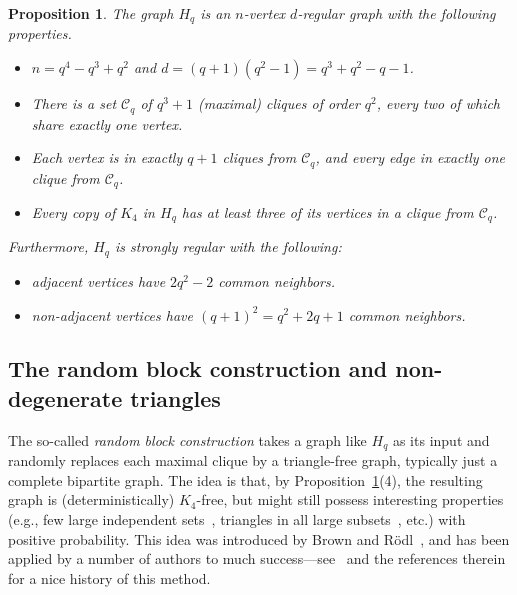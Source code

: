 \documentclass[A4paper,reqno,oneside,12pt]{amsart}
\theoremstyle{plain}
\newtheorem{proposition}[theorem]{Proposition}
\theoremstyle{definition}
\newcommand{\scC}{\mathscr{C}}
\begin{document}
\begin{proposition}
\label{prp: Hq}
    The graph $H_q$ is an $n$-vertex $d$-regular graph with the following properties.
    \begin{itemize}
        \item[1.] $n = q^4-q^3+q^2$ and $d = (q+1)(q^2-1) = q^3 + q^2 - q -1$.
        \item[2.] There is a set $\scC_q$ of $q^3+1$ (maximal) cliques of order $q^2$, every two of which share exactly one vertex.
        \item[3.] Each vertex is in exactly $q+1$ cliques from $\scC_q$, and every edge in exactly one clique from $\scC_q$.
        \item[4.] Every copy of $K_4$ in $H_q$ has at least three of its vertices in a clique from $\scC_q$.
    \end{itemize}
    Furthermore, $H_q$ is strongly regular with the following: 
    \begin{itemize}
        \item[5.] adjacent vertices have $2q^2 - 2$ common neighbors.
        \item[6.] non-adjacent vertices have $(q+1)^2 = q^2 + 2q + 1$ common neighbors.
    \end{itemize}
\end{proposition}

\subsection{The random block construction and non-degenerate triangles}
\label{section: random-block-constr}

The so-called {\it random block construction} takes a graph like $H_q$ as its input and randomly replaces each maximal clique by a triangle-free graph, typically just a complete bipartite graph.
The idea is that, by Proposition~\ref{prp: Hq}(4), the resulting graph is (deterministically) $K_4$-free, but might still possess interesting properties (e.g., few large independent sets~\cite{MV24}, triangles in all large subsets~\cite{JS25, MV25}, etc.) with positive probability.
This idea was introduced by Brown and R\"odl~\cite{BR03}, and has been applied by a number of authors to much success---see~\cite{MV24} and the references therein for a nice history of this method.

\end{document}
